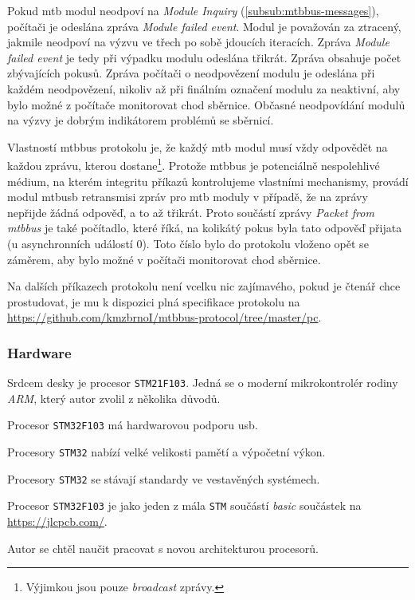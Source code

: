 Pokud \gls{mtb} modul neodpoví na \textit{Module Inquiry}
(\ref{subsub:mtbbus-messages}), počítači je odeslána zpráva \textit{Module
failed event}. Modul je považován za ztracený, jakmile neodpoví na výzvu
ve třech po sobě jdoucích iteracích. Zpráva \textit{Module failed event}
je tedy při výpadku modulu odeslána třikrát. Zpráva obsahuje počet zbývajících
pokusů. Zpráva počítači o neodpovězení modulu je odeslána při každém neodpovězení,
nikoliv až při finálním označení modulu za neaktivní, aby bylo možné z počítače
monitorovat chod sběrnice. Občasné neodpovídání modulů na výzvy je dobrým
indikátorem problémů se sběrnicí.

Vlastností \gls{mtbbus} protokolu je, že každý \gls{mtb} modul musí vždy
odpovědět na každou zprávu, kterou dostane\footnote{Výjimkou jsou pouze
\textit{broadcast} zprávy.}. Protože \gls{mtbbus} je potenciálně nespolehlivé
médium, na kterém integritu příkazů kontrolujeme vlastními mechanismy, provádí
modul \gls{mtbusb} retransmisi zpráv pro \gls{mtb} moduly v případě, že na zprávy
nepřijde žádná odpověď, a to až třikrát. Proto součástí zprávy \textit{Packet
from \gls{mtbbus}} je také počítadlo, které říká, na kolikátý pokus byla tato
odpověď přijata (u asynchronních událostí 0). Toto číslo bylo do protokolu
vloženo opět se záměrem, aby bylo možné v počítači monitorovat chod sběrnice.

Na dalších příkazech protokolu není vcelku nic zajímavého, pokud je čtenář chce
prostudovat, je mu k dispozici plná specifikace protokolu na
\url{https://github.com/kmzbrnoI/mtbbus-protocol/tree/master/pc}.

\subsubsection{Hardware}

Srdcem desky je procesor \texttt{STM21F103}. Jedná se o moderní mikrokontrolér
rodiny \textit{ARM}, který autor zvolil z několika důvodů.

\begin{compactenum}
\item Procesor \texttt{STM32F103} má hardwarovou podporu \gls{usb}.
\item Procesory \texttt{STM32} nabízí velké velikosti pamětí a výpočetní výkon.
\item Procesory \texttt{STM32} se stávají standardy ve vestavěných systémech.
\item Procesor \texttt{STM32F103} je jako jeden z mála \texttt{STM} součástí
	\textit{basic} součástek na \url{https://jlcpcb.com/}.
\item Autor se chtěl naučit pracovat s novou architekturou procesorů.
\end{compactenum}

